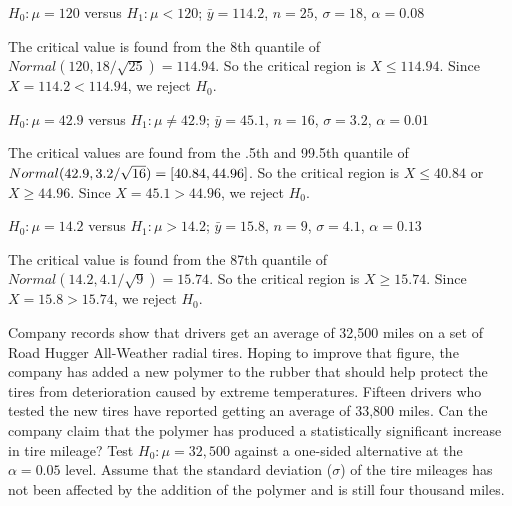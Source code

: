 \documentclass{article}
\begin{document}
\begin{probset}
\begin{prob}[\textbf{6.2.1}]
    \begin{subprobset}
    \begin{subprob}
        $H_0: \mu = 120$ versus $H_1: \mu < 120$; $\bar{y} = 114.2$, $n = 25$, $\sigma = 18$, $\alpha = 0.08$

        \begin{soln}
            The critical value is found from the 8th quantile of $Normal(120, 18/\sqrt{25}) = 114.94$. So the critical region is $X \leq 114.94$. Since $X = 114.2 < 114.94$, we reject $H_0$.
        \end{soln}
    \end{subprob}

    \begin{subprob}
        $H_0: \mu = 42.9$ versus $H_1: \mu \neq 42.9$; $\bar{y} = 45.1$, $n = 16$, $\sigma = 3.2$, $\alpha = 0.01$

        \begin{soln}
            The critical values are found from the .5th and 99.5th quantile of $\newline Normal(42.9, 3.2/\sqrt{16}) = [40.84, 44.96]$. So the critical region is $X \leq 40.84$ or $X \geq 44.96$. Since $X = 45.1 > 44.96$, we reject $H_0$.
        \end{soln}
    \end{subprob}

    \begin{subprob}
        $H_0: \mu = 14.2$ versus $H_1: \mu > 14.2$; $\bar{y} = 15.8$, $n = 9$, $\sigma = 4.1$, $\alpha = 0.13$

        \begin{soln}
            The critical value is found from the 87th quantile of $Normal(14.2, 4.1/\sqrt{9}) = 15.74$. So the critical region is $X \geq 15.74$. Since $X = 15.8 > 15.74$, we reject $H_0$.
        \end{soln}
    \end{subprob}
    \end{subprobset}
\end{prob}

\begin{prob}[\textbf{6.2.4}]
    Company records show that drivers get an average of 32,500 miles on a set of Road Hugger All-Weather radial tires. Hoping to improve that figure, the company has added a new polymer to the rubber that should help protect the tires from deterioration caused by extreme temperatures. Fifteen drivers who tested the new tires have reported getting an average of 33,800 miles. Can the company claim that the polymer has produced a statistically significant increase in tire mileage? Test $H_0: \mu = 32,500$ against a one-sided alternative at the $\alpha = 0.05$ level. Assume that the standard deviation ($\sigma$) of the tire mileages has not been affected by the addition of the polymer and is still four thousand miles.


\end{prob}
\end{probset}
\end{document}

